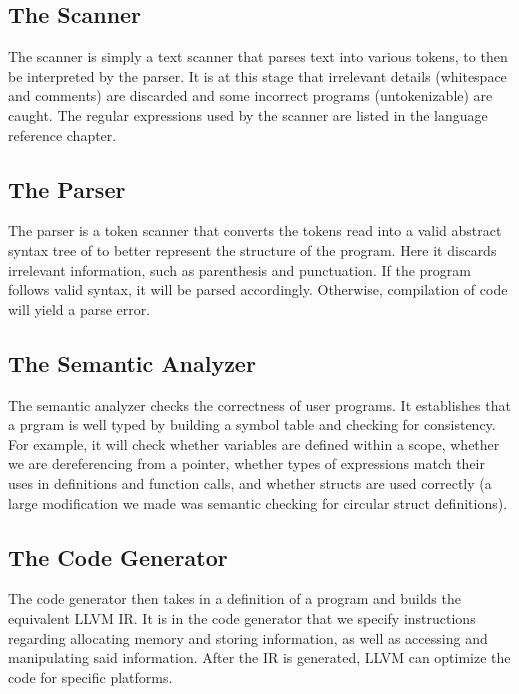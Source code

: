 	\subsection{The Scanner}
    The scanner is simply a text scanner that parses text into various tokens, to then be interpreted by the parser. It is at this stage that irrelevant details (whitespace and comments) are discarded and some incorrect programs (untokenizable) are caught. The regular expressions used by the scanner are listed in the language reference chapter.
	\subsection{The Parser}
    The parser is a token scanner that converts the tokens read into a valid abstract syntax tree of to better represent the structure of the program. Here it discards irrelevant information, such as parenthesis and punctuation. If the program follows valid syntax, it will be parsed accordingly. Otherwise, compilation of code will yield a parse error. 

	\subsection{The Semantic Analyzer}
	The semantic analyzer checks the correctness of user programs. It establishes that a prgram is well typed by building a symbol table and checking for consistency. For example, it will check whether variables are defined within a scope, whether we are dereferencing from a pointer, whether types of expressions match their uses in definitions and function calls, and whether structs are used correctly (a large modification we made was semantic checking for circular struct definitions).

	\subsection{The Code Generator}
	The code generator then takes in a definition of a program and builds the equivalent LLVM IR. It is in the code generator that we specify instructions regarding allocating memory and storing information, as well as accessing and manipulating said information. After the IR is generated, LLVM can optimize the code for specific platforms.